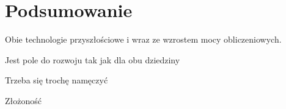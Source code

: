 \chapter{Podsumowanie}
Obie technologie przyszłościowe i wraz ze wzrostem mocy obliczeniowych.

Jest pole do rozwoju tak jak dla obu dziedziny 

Trzeba się trochę namęczyć

Złożoność